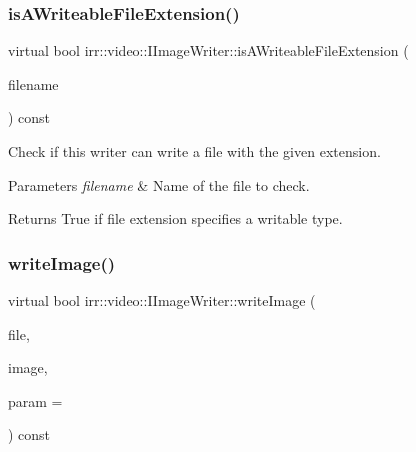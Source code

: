 \subsubsection{\texorpdfstring{is\+A\+Writeable\+File\+Extension()}{isAWriteableFileExtension()}\hspace{0.1cm}{\footnotesize\ttfamily [2/2]}}
{\footnotesize\ttfamily virtual bool irr\+::video\+::\+I\+Image\+Writer\+::is\+A\+Writeable\+File\+Extension (\begin{DoxyParamCaption}\item[{const \hyperlink{namespaceirr_1_1io_a6468281622ce3a1c46b72e19f32dded5}{io\+::path} \&}]{filename }\end{DoxyParamCaption}) const\hspace{0.3cm}{\ttfamily [pure virtual]}}



Check if this writer can write a file with the given extension. 


\begin{DoxyParams}{Parameters}
{\em filename} & Name of the file to check. \\
\hline
\end{DoxyParams}
\begin{DoxyReturn}{Returns}
True if file extension specifies a writable type. 
\end{DoxyReturn}
\mbox{\label{classirr_1_1video_1_1IImageWriter_a0a7f09d1f1613adfe2bfaadc60913f7e}} 
\subsubsection{\texorpdfstring{write\+Image()}{writeImage()}\hspace{0.1cm}{\footnotesize\ttfamily [1/2]}}
{\footnotesize\ttfamily virtual bool irr\+::video\+::\+I\+Image\+Writer\+::write\+Image (\begin{DoxyParamCaption}\item[{\hyperlink{classirr_1_1io_1_1IWriteFile}{io\+::\+I\+Write\+File} $\ast$}]{file,  }\item[{\hyperlink{classirr_1_1video_1_1IImage}{I\+Image} $\ast$}]{image,  }\item[{\hyperlink{namespaceirr_a0416a53257075833e7002efd0a18e804}{u32}}]{param = {} }\end{DoxyParamCaption}) const\hspace{0.3cm}{\ttfamily [pure virtual]}}



